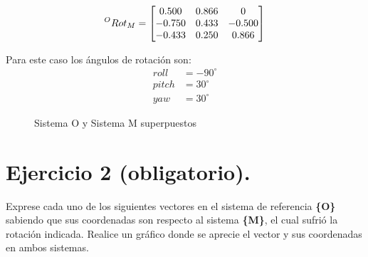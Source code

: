 \documentclass[a4paper,12pt]{article}
\begin{document}
\begin{equation*}
    \prescript{O}{}{Rot_M} = 
    \begin{bmatrix}
        0.500  &  0.866   & 0      \\
        -0.750 &  0.433   & -0.500 \\
        -0.433 &  0.250   & 0.866
    \end{bmatrix}
\end{equation*}

Para este caso los ángulos de rotación son:
\begin{align*}
    roll  &= -90^\circ\\
    pitch &=  30^\circ\\
    yaw   &=  30^\circ
\end{align*}
    
\begin{figure}[H]
    \centering
    \begin{adjustbox}{scale = 0.85, max width=\columnwidth}
    \end{adjustbox}
    \caption{Sistema O y Sistema M superpuestos}
\end{figure}


\section{Ejercicio 2 (obligatorio).}

Exprese cada uno de los siguientes vectores en el sistema de referencia \textbf{\{O\}} sabiendo que sus coordenadas son respecto al sistema \textbf{\{M\}},
el cual sufrió la rotación indicada. Realice un gráfico donde se aprecie el vector y sus coordenadas en ambos 
sistemas.
\end{document}
